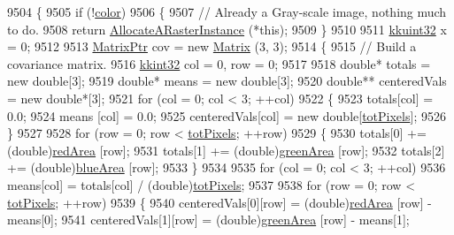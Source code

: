 \begin{DoxyCode}
9504 \{
9505   \textcolor{keywordflow}{if}  (!\hyperlink{class_k_k_b_1_1_raster_a482384d89cc53fa4f36276307c746854}{color})
9506   \{
9507     \textcolor{comment}{// Already a Gray-scale image,  nothing much to do.}
9508     \textcolor{keywordflow}{return} \hyperlink{class_k_k_b_1_1_raster_aa879980d112c01cb7ad9a3cfc7cd6f64}{AllocateARasterInstance} (*\textcolor{keyword}{this});
9509   \}
9510 
9511   \hyperlink{namespace_k_k_b_af8d832f05c54994a1cce25bd5743e19a}{kkuint32}  x = 0;
9512 
9513   \hyperlink{class_k_k_b_1_1_matrix}{MatrixPtr}  cov = \textcolor{keyword}{new} \hyperlink{class_k_k_b_1_1_matrix}{Matrix} (3, 3);
9514   \{
9515     \textcolor{comment}{// Build a covariance matrix.}
9516     \hyperlink{namespace_k_k_b_a8fa4952cc84fda1de4bec1fbdd8d5b1b}{kkint32}  col = 0, row = 0;
9517 
9518     \textcolor{keywordtype}{double}*   totals       = \textcolor{keyword}{new} \textcolor{keywordtype}{double}[3];
9519     \textcolor{keywordtype}{double}*   means        = \textcolor{keyword}{new} \textcolor{keywordtype}{double}[3];
9520     \textcolor{keywordtype}{double}**  centeredVals = \textcolor{keyword}{new} \textcolor{keywordtype}{double}*[3];
9521     \textcolor{keywordflow}{for}  (col = 0;  col < 3;  ++col)
9522     \{
9523       totals[col] = 0.0;
9524       means [col] = 0.0;
9525       centeredVals[col] = \textcolor{keyword}{new} \textcolor{keywordtype}{double}[\hyperlink{class_k_k_b_1_1_raster_a9b08c4a0ca0a35435a478599635f1dc0}{totPixels}];
9526     \}
9527 
9528     \textcolor{keywordflow}{for}  (row = 0;  row < \hyperlink{class_k_k_b_1_1_raster_a9b08c4a0ca0a35435a478599635f1dc0}{totPixels};  ++row)
9529     \{
9530       totals[0] += (double)\hyperlink{class_k_k_b_1_1_raster_aaef16f7d4dc7c8b99e84176d0babd731}{redArea}   [row];
9531       totals[1] += (double)\hyperlink{class_k_k_b_1_1_raster_ad981258f1f7284a8bd0cd0466f328cdf}{greenArea} [row];
9532       totals[2] += (double)\hyperlink{class_k_k_b_1_1_raster_af7996dfe61613e5ecf91454175bfe3f1}{blueArea}  [row];
9533     \}
9534 
9535     \textcolor{keywordflow}{for}  (col = 0;  col < 3;  ++col)
9536       means[col] = totals[col] / (\textcolor{keywordtype}{double})\hyperlink{class_k_k_b_1_1_raster_a9b08c4a0ca0a35435a478599635f1dc0}{totPixels};
9537 
9538     \textcolor{keywordflow}{for}  (row = 0;  row < \hyperlink{class_k_k_b_1_1_raster_a9b08c4a0ca0a35435a478599635f1dc0}{totPixels};  ++row)
9539     \{
9540       centeredVals[0][row] = (double)\hyperlink{class_k_k_b_1_1_raster_aaef16f7d4dc7c8b99e84176d0babd731}{redArea}   [row] - means[0];
9541       centeredVals[1][row] = (double)\hyperlink{class_k_k_b_1_1_raster_ad981258f1f7284a8bd0cd0466f328cdf}{greenArea} [row] - means[1];

\end{DoxyCode}
